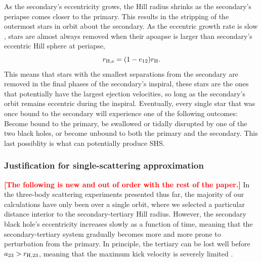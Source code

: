 \documentclass[a4paper,twocolumn]{emulateapj}
\newcommand{\colr}[1]{{\bf \textcolor{red}{[#1]}}}
\begin{document}
As the secondary's eccentricity grows, the Hill radius shrinks as the secondary's periapse comes closer to the primary. This results in the stripping of the outermost stars in orbit about the secondary. As the eccentric growth rate is slow \citep[$\sim 10^{8}$ yr,][]{Iwasawa:2011cv}, stars are almost always removed when their apoapse is larger than secondary's eccentric Hill sphere at periapse,
\begin{equation}
r_{\rm H,e} = (1 - e_{12}) r_{\rm H}.
\end{equation}
This means that stars with the smallest separations from the secondary are removed in the final phases of the secondary's inspiral, these stars are the ones that potentially have the largest ejection velocities, so long as the secondary's orbit remains eccentric during the inspiral. Eventually, every single star that was once bound to the secondary will experience one of the following outcomes: Become bound to the primary, be swallowed or tidally disrupted by one of the two black holes, or become unbound to both the primary and the secondary. This last possiblity is what can potentially produce SHS.

\subsubsection{Justification for single-scattering approximation}
\colr{The following is new and out of order with the rest of the paper.} In the three-body scattering experiments presented thus far, the majority of our calculations have only been over a single orbit, where we selected a particular distance interior to the secondary-tertiary Hill radius. However, the secondary black hole's eccentricity increases slowly as a function of time, meaning that the secondary-tertiary system gradually becomes more and more prone to perturbation from the primary. In principle, the tertiary can be lost well before $a_{23} > r_{{\rm H},23}$, meaning that the maximum kick velocity is severely limited \citep{Sari:2010de}.
\end{document}
